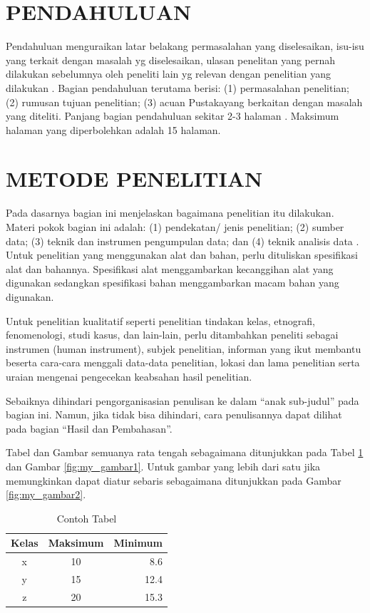 \documentclass{iaesarticle-progres}
\begin{document}

\section{PENDAHULUAN}
\label{pendahuluan}
Pendahuluan menguraikan latar belakang permasalahan yang diselesaikan, isu-isu yang terkait dengan masalah yg diselesaikan, ulasan penelitan yang pernah dilakukan sebelumnya oleh peneliti lain yg relevan dengan penelitian yang dilakukan \parencite{Maulyda2020,Erfan2020}. Bagian pendahuluan terutama berisi: (1) permasalahan penelitian; (2) rumusan tujuan penelitian; (3) acuan Pustakayang berkaitan dengan masalah yang diteliti. Panjang bagian pendahuluan sekitar 2-3 halaman \parencite{Ermiana2020}. Maksimum halaman yang diperbolehkan adalah 15 halaman.

\section{METODE PENELITIAN}
\label{metode}
Pada dasarnya bagian ini menjelaskan bagaimana penelitian itu dilakukan. Materi pokok bagian ini adalah: (1) pendekatan/ jenis penelitian; (2) sumber data; (3) teknik dan instrumen pengumpulan data; dan (4) teknik analisis data \parencite{Affandi2020}. Untuk penelitian yang menggunakan alat dan bahan, perlu dituliskan spesifikasi alat dan bahannya. Spesifikasi alat menggambarkan kecanggihan alat yang digunakan sedangkan spesifikasi bahan menggambarkan macam bahan yang digunakan.

Untuk penelitian kualitatif seperti penelitian tindakan kelas, etnografi, fenomenologi, studi kasus, dan lain-lain, perlu ditambahkan peneliti sebagai instrumen (human instrument), subjek penelitian, informan yang ikut membantu beserta cara-cara menggali data-data penelitian, lokasi dan lama penelitian serta uraian mengenai pengecekan keabsahan hasil penelitian.

Sebaiknya dihindari pengorganisasian penulisan ke dalam “anak sub-judul” pada bagian ini. Namun, jika tidak bisa dihindari, cara penulisannya dapat dilihat pada bagian “Hasil dan Pembahasan”.

Tabel dan Gambar semuanya rata tengah sebagaimana ditunjukkan pada Tabel \ref{tab:tabel_1} dan Gambar \ref{fig:my_gambar1}. Untuk gambar yang lebih dari satu jika memungkinkan dapat diatur sebaris sebagaimana ditunjukkan pada Gambar \ref{fig:my_gambar2}.

\begin{table}[H]
\centering
\fontsize{8pt}{10pt}\selectfont
\caption{Contoh Tabel}
\label{tab:tabel_1}
\begin{tabular}{ccr}
\hline
Kelas & Maksimum & Minimum \\
\hline
x & 10 & 8.6 \\
y & 15 & 12.4 \\
z & 20 & 15.3 \\
\hline
\end{tabular}
\end{table}
\end{document}
